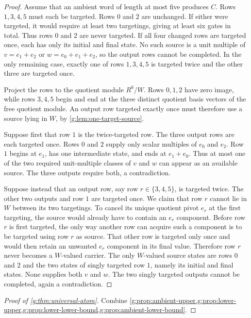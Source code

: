 \begin{proof}
Assume that an ambient word of length at most five produces $C$.  Rows $1,3,4,5$ must each be targeted.  Rows $0$ and $2$ are unchanged.  If either were targeted, it would require at least two targetings, giving at least six gates in total.  Thus rows $0$ and $2$ are never targeted.  If all four changed rows are targeted once, each has only its initial and final state.  No such source is a unit multiple of $v=e_1+e_2$ or $w=e_0+e_1+e_2$, so the output rows cannot be completed.  In the only remaining case, exactly one of rows $1,3,4,5$ is targeted twice and the other three are targeted once.

Project the rows to the quotient module $R^6/W$.  Rows $0,1,2$ have zero image, while rows $3,4,5$ begin and end at the three distinct quotient basis vectors of the free quotient module.  An output row targeted exactly once must therefore use a source lying in $W$, by \cref{g:lem:one-target-source}.

Suppose first that row $1$ is the twice-targeted row.  The three output rows are each targeted once.  Rows $0$ and $2$ supply only scalar multiples of $e_0$ and $e_2$.  Row $1$ begins at $e_1$, has one intermediate state, and ends at $e_1+e_0$.  Thus at most one of the two required unit-multiple classes of $v$ and $w$ can appear as an available source.  The three outputs require both, a contradiction.

Suppose instead that an output row, say row $r\in\{3,4,5\}$, is targeted twice.  The other two outputs and row $1$ are targeted once.  We claim that row $r$ cannot lie in $W$ between its two targetings.  To cancel its unique quotient pivot $e_r$ at the first targeting, the source would already have to contain an $e_r$ component.  Before row $r$ is first targeted, the only way another row can acquire such a component is to be targeted using row $r$ as source.  That other row is targeted only once and would then retain an unwanted $e_r$ component in its final value.  Therefore row $r$ never becomes a $W$-valued carrier.  The only $W$-valued source states are rows $0$ and $2$ and the two states of singly targeted row $1$, namely its initial and final states.  None supplies both $v$ and $w$.  The two singly targeted outputs cannot be completed, again a contradiction.
\end{proof}

\begin{proof}[Proof of \cref{g:thm:universal-atom}]
Combine \cref{g:prop:ambient-upper,g:prop:lower-upper,g:prop:lower-lower-bound,g:prop:ambient-lower-bound}.
\end{proof}

